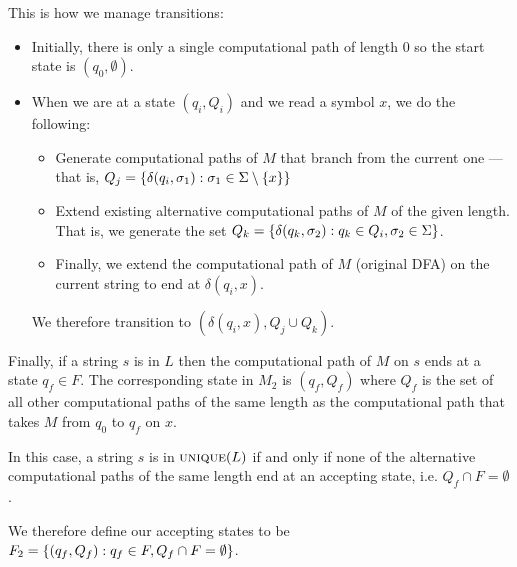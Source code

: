 \begin{Answer}
  \step
  This is how we manage transitions:
  \begin{itemize}
    \item Initially, there is only a single computational path of length 0
      so the start state is $(q_0, \emptyset)$.
    \item When we are at a state $(q_i, Q_i)$ and we read a symbol $x$,
      we do the following:
      \begin{itemize}
        \item Generate computational paths of $M$ that branch from the current one ---
          that is, $Q_j = \left\{\delta(q_i, \sigma_1) : \sigma_1 \in \Sigma \setminus \left\{x\right\}\right\}$
        \item Extend existing alternative computational paths of $M$ of the given length.\\
          That is, we generate the set 
          $Q_k = \left\{\delta(q_k, \sigma_2) : q_k \in Q_i, \sigma_2 \in \Sigma\right\}$.
        \item Finally, we extend the computational path of $M$ (original DFA) on the current string to
          end at $\delta(q_i, x)$.
      \end{itemize}
      We therefore transition to $(\delta(q_i, x), Q_j \cup Q_k)$.
  \end{itemize}

  \step
  Finally, if a string $s$ is in $L$ then the computational path of $M$ on $s$
  ends at a state $q_f \in F$. The corresponding state in $M_2$ is $(q_f, Q_f)$
  where $Q_f$ is the set of all other computational paths of the same length
  as the computational path that takes $M$ from $q_0$ to $q_f$ on $x$.

  \step
  In this case, a string $s$ is in $\textsc{unique}(L)$ if and only if
  none of the alternative computational paths of the same length
  end at an accepting state, i.e. $Q_f \cap F = \emptyset$.

  \step
  We therefore define our accepting states to be
  $F_2 = \left\{(q_f, Q_f) : q_f \in F, Q_f \cap F = \emptyset\right\}$.
\end{Answer}
